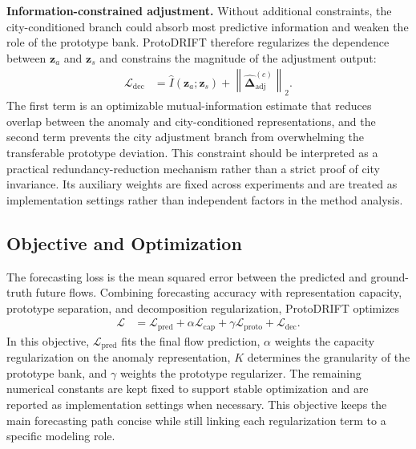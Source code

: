 \textbf{Information-constrained adjustment.} Without additional constraints, the city-conditioned branch could absorb most predictive information and weaken the role of the prototype bank. ProtoDRIFT therefore regularizes the dependence between $\mathbf{z}_a$ and $\mathbf{z}_s$ and constrains the magnitude of the adjustment output:
\begin{equation}
\begin{aligned}
    \mathcal{L}_{\mathrm{dec}}
    &=\widehat{I}(\mathbf{z}_a;\mathbf{z}_s)
    +\left\|\widehat{\boldsymbol{\Delta}}^{(c)}_{\mathrm{adj}}\right\|_2.
\end{aligned}
\end{equation}
The first term is an optimizable mutual-information estimate that reduces overlap between the anomaly and city-conditioned representations, and the second term prevents the city adjustment branch from overwhelming the transferable prototype deviation. This constraint should be interpreted as a practical redundancy-reduction mechanism rather than a strict proof of city invariance. Its auxiliary weights are fixed across experiments and are treated as implementation settings rather than independent factors in the method analysis.

\subsection{Objective and Optimization}

The forecasting loss is the mean squared error between the predicted and ground-truth future flows. Combining forecasting accuracy with representation capacity, prototype separation, and decomposition regularization, ProtoDRIFT optimizes
\begin{equation}
\begin{aligned}
    \mathcal{L}
    &=\mathcal{L}_{\mathrm{pred}}
    +\alpha\mathcal{L}_{\mathrm{cap}}
    +\gamma\mathcal{L}_{\mathrm{proto}}
    +\mathcal{L}_{\mathrm{dec}}.
\end{aligned}
\end{equation}
In this objective, $\mathcal{L}_{\mathrm{pred}}$ fits the final flow prediction, $\alpha$ weights the capacity regularization on the anomaly representation, $K$ determines the granularity of the prototype bank, and $\gamma$ weights the prototype regularizer. The remaining numerical constants are kept fixed to support stable optimization and are reported as implementation settings when necessary. This objective keeps the main forecasting path concise while still linking each regularization term to a specific modeling role.

